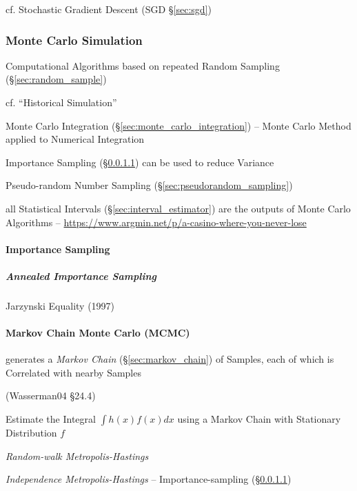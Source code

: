 cf. Stochastic Gradient Descent (SGD \S\ref{sec:sgd})



\subsubsection{Monte Carlo Simulation}\label{sec:monte_carlo}

Computational Algorithms based on repeated Random Sampling
(\S\ref{sec:random_sample})

cf. ``Historical Simulation''

Monte Carlo Integration (\S\ref{sec:monte_carlo_integration}) -- Monte Carlo
Method applied to Numerical Integration

Importance Sampling (\S\ref{sec:importance_sampling}) can be used to reduce
Variance

Pseudo-random Number Sampling (\S\ref{sec:pseudorandom_sampling})

all Statistical Intervals (\S\ref{sec:interval_estimator}) are the outputs of
Monte Carlo Algorithms --
\url{https://www.argmin.net/p/a-casino-where-you-never-lose}



\paragraph{Importance Sampling}\label{sec:importance_sampling}\hfill

\subparagraph{Annealed Importance Sampling}\label{sec:ais}\hfill

Jarzynski Equality (1997)



\paragraph{Markov Chain Monte Carlo (MCMC)}\label{sec:mcmc}\hfill

generates a \emph{Markov Chain} (\S\ref{sec:markov_chain}) of Samples, each of
which is Correlated with nearby Samples

(Wasserman04 \S24.4)

Estimate the Integral $\int h(x) f(x) dx$ using a Markov Chain with Stationary
Distribution $f$

\emph{Random-walk Metropolis-Hastings}

\emph{Independence Metropolis-Hastings} -- Importance-sampling
(\S\ref{sec:importance_sampling})



